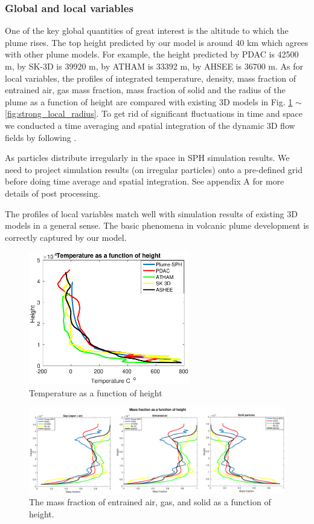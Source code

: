 \documentclass[gmd, manuscript]{copernicus}
\begin{document}
\subsubsection{Global and local variables}
One of the key global quantities of great interest is the altitude to which the plume rises. The top height predicted by our model is around 40 km which agrees with other plume models. For example, the height predicted by PDAC is 42500 m, by SK-3D is 39920 m, by ATHAM is 33392 m, by AHSEE is 36700 m. As for local variables, the profiles of integrated temperature, density, mass fraction of entrained air, gas mass fraction, mass fraction of solid and the radius of the plume as a function of height are compared with existing 3D models in Fig. \ref{fig:strong_local_temp} $\sim$ \ref{fig:strong_local_radius}. To get rid of significant fluctuations in time and space we conducted a time averaging and spatial integration of the dynamic 3D flow fields by following \citet {cerminara2016large}.

As particles distribute irregularly in the space in SPH simulation results. We need to project simulation results (on irregular particles) onto a pre-defined grid before doing time average and spatial integration. See appendix A for more details of post processing.

The profiles of local variables match well with simulation results of existing 3D models in a general sense. The basic phenomena in volcanic plume development is correctly captured by our model.

\begin{figure}
\center
\includegraphics[width=7cm]{Fig11}
\caption{Temperature as a function of height}
\label{fig:strong_local_temp}
\end{figure}

\begin{figure}
\includegraphics[width=15cm]{Fig12}
\caption{The mass fraction of entrained air, gas, and solid as a function of height.}
\label{fig:strong_plume_mass_fraction}
\end{figure}
\end{document}
